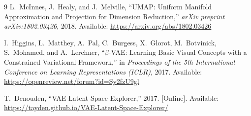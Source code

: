 \documentclass{article}
\begin{document}
\begin{thebibliography}{9}
L.~McInnes, J.~Healy, and J.~Melville,
``UMAP: Uniform Manifold Approximation and Projection for Dimension
Reduction,''
\emph{arXiv preprint arXiv:1802.03426}, 2018.
Available: \url{https://arxiv.org/abs/1802.03426}

I.~Higgins, L.~Matthey, A.~Pal, C.~Burgess, X.~Glorot, M.~Botvinick,
S.~Mohamed, and A.~Lerchner,
``$\beta$-VAE: Learning Basic Visual Concepts with a Constrained Variational
Framework,''
in \emph{Proceedings of the 5th International Conference on Learning
Representations (ICLR)}, 2017.
Available: \url{https://openreview.net/forum?id=Sy2fzU9gl}

T.~Denouden,
``VAE Latent Space Explorer,''
2017. [Online]. Available: \url{https://tayden.github.io/VAE-Latent-Space-Explorer/}

\end{thebibliography}
\end{document}
